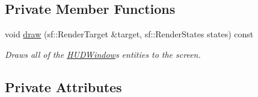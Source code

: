 \subsection*{Private Member Functions}
\begin{DoxyCompactItemize}
\item 
void \hyperlink{class_h_u_d_window_aaffd8bce3d1cd1fde416a69fabd9f81a}{draw} (sf\+::\+Render\+Target \&target, sf\+::\+Render\+States states) const
\begin{DoxyCompactList}\small\item\em Draws all of the \hyperlink{class_h_u_d_window}{H\+U\+D\+Window}\textquotesingle{}s entities to the screen. \end{DoxyCompactList}\end{DoxyCompactItemize}
\subsection*{Private Attributes}
